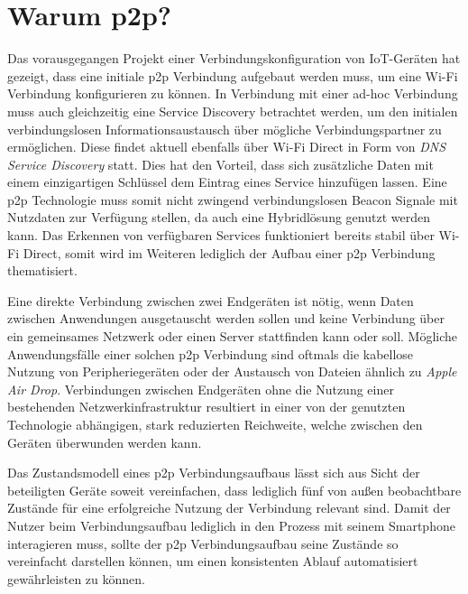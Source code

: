 \section{Warum p2p?}
    Das vorausgegangen Projekt einer Verbindungskonfiguration von IoT-Geräten \linebreak \cite{aiProject} hat gezeigt, dass eine initiale p2p Verbindung aufgebaut werden muss, um eine Wi-Fi Verbindung konfigurieren zu können. In Verbindung mit einer ad-hoc Verbindung muss auch gleichzeitig eine Service Discovery betrachtet werden, um den initialen verbindungslosen Informationsaustausch über mögliche Verbindungspartner zu ermöglichen. Diese  findet aktuell ebenfalls über Wi-Fi Direct in Form von {\it DNS Service Discovery} statt. Dies hat den Vorteil, dass sich zusätzliche Daten mit einem einzigartigen Schlüssel dem Eintrag eines Service hinzufügen lassen. Eine p2p Technologie muss somit nicht zwingend verbindungslosen Beacon Signale mit Nutzdaten zur Verfügung stellen, da auch eine Hybridlösung genutzt werden kann. Das Erkennen von verfügbaren Services funktioniert bereits stabil über Wi-Fi Direct, somit wird im Weiteren lediglich der Aufbau einer p2p Verbindung thematisiert.
    
    Eine direkte Verbindung zwischen zwei Endgeräten ist nötig, wenn Daten zwischen Anwendungen ausgetauscht werden sollen und keine Verbindung über ein gemeinsames Netzwerk oder einen Server stattfinden kann oder soll. Mögliche Anwendungsfälle einer solchen p2p Verbindung sind oftmals die kabellose Nutzung von Peripheriegeräten oder der Austausch von Dateien ähnlich zu {\it Apple Air Drop}. Verbindungen zwischen Endgeräten ohne die Nutzung einer bestehenden Netzwerkinfrastruktur resultiert in einer von der genutzten Technologie abhängigen, stark reduzierten Reichweite, welche zwischen den Geräten überwunden werden kann.
    
    Das Zustandsmodell  eines p2p Verbindungsaufbaus lässt sich aus Sicht der beteiligten Geräte soweit vereinfachen, dass lediglich fünf von außen beobachtbare Zustände für eine erfolgreiche Nutzung der Verbindung relevant sind. Damit der Nutzer beim Verbindungsaufbau lediglich in den Prozess mit seinem Smartphone interagieren muss, sollte der p2p Verbindungsaufbau seine Zustände so vereinfacht darstellen können, um einen konsistenten Ablauf automatisiert gewährleisten zu können.
    
